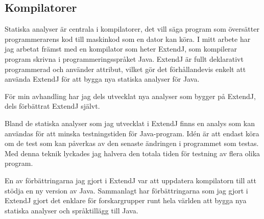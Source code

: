 \documentclass[10pt, twoside, openright]{book}
\begin{document}
\subsection*{Kompilatorer}

Statiska analyser är centrala i kompilatorer, det vill säga program som översätter programmerarens
kod till maskinkod som en dator kan köra.
I mitt arbete har jag arbetat främst med en kompilator som heter ExtendJ, som
kompilerar program skrivna i programmeringsspråket Java. ExtendJ är fullt deklarativt
programmerad och använder attribut, vilket gör det förhållandevis enkelt att använda ExtendJ för att
bygga nya statiska analyser för Java.

För min avhandling har jag
dels utvecklat nya analyser som bygger på ExtendJ,
dels förbättrat ExtendJ självt.

Bland de statiska analyser som jag utvecklat i ExtendJ finns en analys som kan användas
för att minska testningstiden för Java-program. Idén är att endast köra om de test som kan påverkas av
den senaste ändringen i programmet som testas.
Med denna teknik lyckades jag halvera den totala tiden för testning av
flera olika program.

En av förbättringarna jag gjort i ExtendJ var att uppdatera kompilatorn till att
stödja en ny version av Java.  Sammanlagt har förbättringarna som jag gjort i
ExtendJ gjort det enklare för forskargrupper runt hela världen att bygga nya
statiska analyser och språktillägg till Java.
\end{document}
